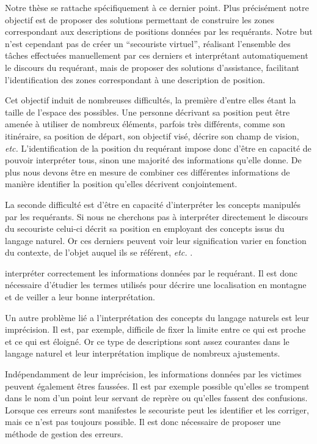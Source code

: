 Notre thèse se rattache spécifiquement à ce dernier point. Plus
précisément notre objectif est de proposer des solutions permettant de
construire les zones correspondant aux descriptions de positions
données par les requérants. Notre but n'est cependant pas de créer un
\enquote{secouriste virtuel}, réalisant l'ensemble des tâches
effectuées manuellement par ces derniers et interprétant
automatiquement le discours du requérant, mais de proposer des
solutions d'assistance, facilitant l'identification des zones
correspondant à une description de position.

Cet objectif induit de nombreuses difficultés, la première d'entre
elles étant la taille de l'espace des possibles. Une personne
décrivant sa position peut être amenée à utiliser de nombreux
éléments, parfois très différents, comme son itinéraire, sa position
de départ, son objectif visé, décrire son champ de vision, \emph{etc.}
L'identification de la position du requérant impose donc d'être en
capacité de pouvoir interpréter tous, sinon une majorité des
informations qu'elle donne. De plus nous devons être en mesure de
combiner ces différentes informations de manière identifier la
position qu'elles décrivent conjointement.

La seconde difficulté est d'être en capacité d'interpréter les
concepts manipulés par les requérants. Si nous ne cherchons pas à
interpréter directement le discours du secouriste celui-ci décrit sa
position en employant des concepts issus du langage naturel. Or ces
derniers peuvent voir leur signification varier en fonction du
contexte, de l'objet auquel ils se référent, \emph{etc.}
\autocite{Vandeloise1986}.



interpréter correctement les informations
données par le requérant. Il est donc nécessaire d'étudier les termes
utilisés pour décrire une localisation en montagne et de veiller a
leur bonne interprétation.

Un autre problème lié a l'interprétation des concepts du langage
naturels est leur imprécision. Il est, par exemple, difficile de fixer
la limite entre ce qui est proche et ce qui est éloigné. Or ce type de
descriptions sont assez courantes dans le langage naturel et leur
interprétation implique de nombreux ajustements.

Indépendamment de leur imprécision, les informations données par les
victimes peuvent également êtres faussées. Il est par exemple possible
qu'elles se trompent dans le nom d'un point leur servant de reprère ou
qu'elles fassent des confusions. Lorsque ces erreurs sont manifestes
le secouriste peut les identifier et les corriger, mais ce n'est pas
toujours possible. Il est donc nécessaire de proposer une méthode de
gestion des erreurs.


